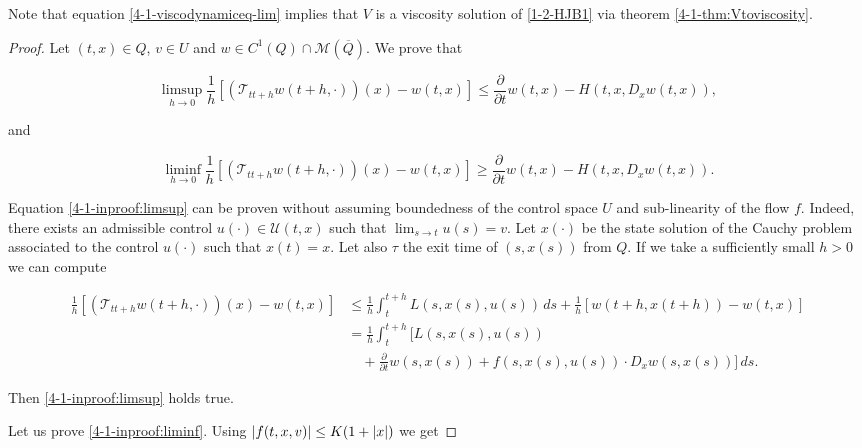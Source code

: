 \vspace{5mm}

Note that equation \ref{4-1-viscodynamiceq-lim} implies that $V$ is a viscosity solution of \ref{1-2-HJB1} via theorem \ref{4-1-thm:Vtoviscosity}.

\vspace{5mm}

\begin{proof}

    Let $(t,x)\in Q$, $v\in U$ and $w\in C^1(Q)\cap\mathcal{M}(\overline{Q})$. We prove that
    
    \begin{equation}\label{4-1-inproof:limsup}\limsup_{h\to0}\frac{1}{h}\left[(\mathcal{T}_{tt+h}w(t+h,\cdot))(x)-w(t,x)\right]\leq\frac{\partial}{\partial t}w(t,x) - H(t,x,D_xw(t,x)),\end{equation}

    and 

    \begin{equation}\label{4-1-inproof:liminf}\liminf_{h\to0}\frac{1}{h}\left[(\mathcal{T}_{tt+h}w(t+h,\cdot))(x)-w(t,x)\right]\geq\frac{\partial}{\partial t}w(t,x) - H(t,x,D_xw(t,x)).\end{equation}
    
    Equation \ref{4-1-inproof:limsup} can be proven without assuming boundedness of the control space $U$ and sub-linearity of the flow $f$. Indeed, there exists an admissible control $u(\cdot)\in \mathcal{U}(t,x)$ 
    such that $\lim_{s\to t}u(s)=v$. Let $x(\cdot)$ be the state solution of the Cauchy problem associated 
    to the control $u(\cdot)$ such that $x(t)=x$. Let also $\tau$ the exit time of $(s,x(s))$ from $Q$. If we take a sufficiently small $h>0$ we can compute
    
    \begin{align*}
        \frac{1}{h}\left[(\mathcal{T}_{tt+h}w(t+h,\cdot))(x)-w(t,x)\right] & \leq \frac{1}{h}\int_t^{t+h}L(s,x(s),u(s))\,ds + \frac{1}{h}\left[w(t+h,x(t+h))-w(t,x)\right] \\
        & =  \frac{1}{h}\int_t^{t+h}\bigg[L(s,x(s),u(s)) \\ 
        & \quad + \frac{\partial}{\partial t}w(s,x(s)) + f(s,x(s),u(s))\cdot D_xw(s,x(s))\bigg]\,ds.
    \end{align*}
    
    Then \ref{4-1-inproof:limsup} holds true. 
    
    Let us prove \ref{4-1-inproof:liminf}. Using $\abs{f(t,x,v)}\leq K(1+\abs{x})$ we get


\end{proof}
